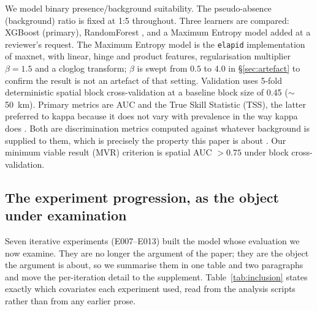 \documentclass[12pt]{article}
\begin{document}
We model binary presence/background suitability.
The pseudo-absence (background) ratio is fixed at 1:5 throughout.
Three learners are compared: XGBoost \citep{chen2016} (primary), RandomForest \citep{breiman2001}, and a Maximum Entropy model \citep{phillips2006, elith2006} added at a reviewer's request.
The Maximum Entropy model is the \texttt{elapid} implementation of maxnet, with linear, hinge and product features, regularisation multiplier $\beta = 1.5$ and a cloglog transform; $\beta$ is swept from $0.5$ to $4.0$ in \S\ref{sec:artefact} to confirm the result is not an artefact of that setting.
Validation uses 5-fold deterministic spatial block cross-validation at a baseline block size of 0.45\textdegree{} ($\sim$50~km).
Primary metrics are AUC and the True Skill Statistic (TSS), the latter preferred to kappa because it does not vary with prevalence in the way kappa does \citep{allouche2006}.
Both are discrimination metrics computed against whatever background is supplied to them, which is precisely the property this paper is about \citep{lobo2008, guillera2015}.
Our minimum viable result (MVR) criterion is spatial AUC $> 0.75$ under block cross-validation.

\subsection{The experiment progression, as the object under examination}
\label{sec:progression}

Seven iterative experiments (E007--E013) built the model whose evaluation we now examine.
They are no longer the argument of the paper; they are the object the argument is about, so we summarise them in one table and two paragraphs and move the per-iteration detail to the supplement.
Table~\ref{tab:inclusion} states exactly which covariates each experiment used, read from the analysis scripts rather than from any earlier prose.
\end{document}
